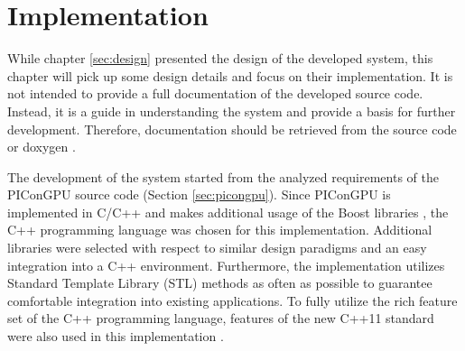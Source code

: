 \chapter{Implementation}
\label{sec:implementation}


While chapter \ref{sec:design} presented the design of the developed
system, this chapter will pick up some design details and focus on
their implementation.  It is not intended to provide a full
documentation of the developed source code. Instead, it is a
guide in understanding the system and provide a basis for further
development. Therefore, documentation should be retrieved from the
source code or doxygen \cite{ref:doxygen}.

The development of the system started from the analyzed requirements
of the PIConGPU source code (Section \ref{sec:picongpu}). Since
PIConGPU is implemented in C/C++ and makes additional usage of the
Boost libraries \cite{ref:boost}, the C++ programming language was
chosen for this implementation. Additional libraries were selected with
respect to similar design paradigms and an easy
integration into a C++ environment. Furthermore, the implementation
utilizes Standard Template Library (STL) methods as often as
possible to guarantee comfortable integration into existing applications.  To
fully utilize the rich feature set of the C++ programming language,
features of the new C++11 standard were also used in this 
implementation \cite{ref:c++11}.

